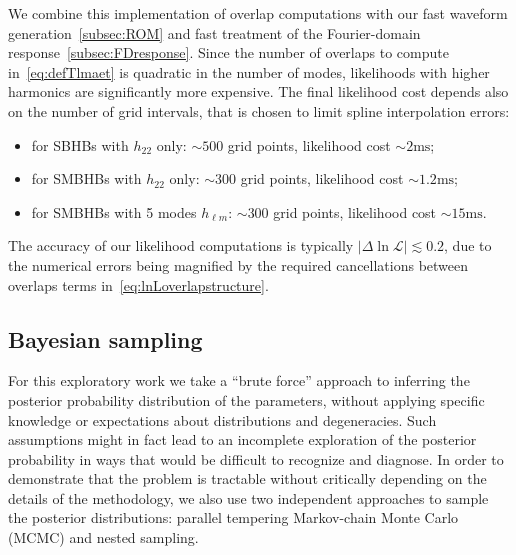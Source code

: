 \documentclass[aps,showpacs,twocolumn,prd,superscriptaddress,nofootinbib]{revtex4-1}
\newcommand\calL{{\mathcal{L}}}
\begin{document}
We combine this implementation of overlap computations with our fast waveform generation~\ref{subsec:ROM} and fast treatment of the Fourier-domain response~\ref{subsec:FDresponse}. Since the number of overlaps to compute in~\eqref{eq:defTlmaet} is quadratic in the number of modes, likelihoods with higher harmonics are significantly more expensive. The final likelihood cost depends also on the number of grid intervals, that is chosen to limit spline interpolation errors:
\begin{itemize}
	\item for SBHBs with $h_{22}$ only: $\sim 500$ grid points, likelihood cost $\sim 2\mathrm{ms}$;
	\item for SMBHBs with $h_{22}$ only: $\sim 300$ grid points, likelihood cost $\sim 1.2\mathrm{ms}$;
	\item for SMBHBs with 5 modes $h_{\ell m}$: $\sim 300$ grid points, likelihood cost $\sim 15\mathrm{ms}$.
\end{itemize}
The accuracy of our likelihood computations is typically $|\Delta \ln \calL| \lesssim 0.2$, due to the numerical errors being magnified by the required cancellations between overlaps terms in~\eqref{eq:lnLoverlapstructure}.



\subsection{Bayesian sampling}
\label{subsec:samplers}

For this exploratory work we take a ``brute force'' approach to inferring the posterior probability distribution of the parameters, without applying specific knowledge or expectations about distributions and degeneracies. Such assumptions might in fact lead to an incomplete exploration of the posterior probability in ways that would be difficult to recognize and diagnose. In order to demonstrate that the problem is tractable without critically depending on the details of the methodology, we also use two independent approaches to sample the posterior distributions: parallel tempering Markov-chain Monte Carlo (MCMC) and nested sampling.
\end{document}

